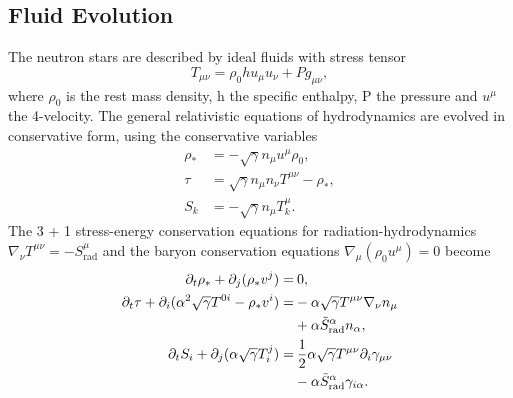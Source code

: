 
\subsection{Fluid Evolution}

The neutron stars are described by ideal fluids with stress tensor
\begin{equation}
T_{\mu\nu} = \rho_0 h u_\mu u_\nu + Pg_{\mu\nu},
\end{equation}
%
where $\rho_0$ is the rest mass density, h the specific enthalpy, P the pressure and $u^\mu$ the 4-velocity. The general relativistic equations of hydrodynamics are evolved in conservative form, using the conservative variables
%
\begin{align}
  \rho_* &= -\sqrt{\gamma}n_\mu u^\mu \rho_0, \\
  \tau &= \sqrt{\gamma}n_\mu n_\nu T^{\mu\nu} - \rho_*, \\
  S_k &= -\sqrt{\gamma}n_\mu T^\mu_k.
\end{align}
%
The 3 + 1 stress-energy conservation equations for radiation-hydrodynamics $\nabla_\nu T^{\mu\nu} = -S^\mu_\text{rad}$ and the baryon conservation equations $\nabla_\mu (\rho_0 u^\mu) = 0$ become \cite{shibata2011truncated}
%
%
\begin{align}
  \partial_t \rho_* + \partial_j(\rho_* v^j) =&\:0, \\
  \partial_t \tau + \partial_i (\alpha^2 \sqrt{\gamma} T^{0i} - \rho_* v^i) =& -\alpha \sqrt{\gamma} T^{\mu\nu} \nabla_\nu n_\mu\\
  &+ \alpha \tilde S_\text{rad}^\alpha n_\alpha, \notag\\
  \partial_t S_i + \partial_j(\alpha\sqrt{\gamma}T^j_i) =&\: \frac{1}{2}\alpha \sqrt{\gamma} T^{\mu\nu} \partial_i \gamma_{\mu\nu} \\
  &- \alpha \tilde S_\text{rad}^\alpha \gamma_{i\alpha}.\notag
\end{align}

